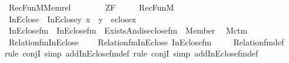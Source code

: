 %
\begin{isabellebody}%
%
%
\isadelimtheory
%
\endisadelimtheory
%
\isatagtheory
{}\isamarkupfalse%
\ RecFun{\isacharunderscore}{\kern0pt}M{\isacharunderscore}{\kern0pt}Memrel\isanewline
\ \ \ \isanewline
\ \ \ \ ZF\ \isanewline
\ \ \ \ RecFun{\isacharunderscore}{\kern0pt}M\isanewline
{}%
\endisatagtheory
{\isafoldtheory}%
%
\isadelimtheory
\ \isanewline
%
\endisadelimtheory
\isanewline
{}\isamarkupfalse%
\ InEclose\ \ {\isachardoublequoteopen}InEclose{\isacharparenleft}{\kern0pt}y{\isacharcomma}{\kern0pt}\ x{\isacharparenright}{\kern0pt}\ {\isasymequiv}\ y\ {\isasymin}\ eclose{\isacharparenleft}{\kern0pt}x{\isacharparenright}{\kern0pt}{\isachardoublequoteclose}\ \ \isanewline
{}\isamarkupfalse%
\ InEclose{\isacharunderscore}{\kern0pt}fm\ \ {\isachardoublequoteopen}InEclose{\isacharunderscore}{\kern0pt}fm\ {\isasymequiv}\ Exists{\isacharparenleft}{\kern0pt}And{\isacharparenleft}{\kern0pt}is{\isacharunderscore}{\kern0pt}eclose{\isacharunderscore}{\kern0pt}fm{\isacharparenleft}{\kern0pt}{}{\isacharcomma}{\kern0pt}\ {}{\isacharparenright}{\kern0pt}{\isacharcomma}{\kern0pt}\ Member{\isacharparenleft}{\kern0pt}{}{\isacharcomma}{\kern0pt}\ {}{\isacharparenright}{\kern0pt}{\isacharparenright}{\kern0pt}{\isacharparenright}{\kern0pt}{\isachardoublequoteclose}\isanewline
\isanewline
{}\isamarkupfalse%
\ M{\isacharunderscore}{\kern0pt}ctm\ \isanewline
{}\ \isanewline
\isanewline
{}\isamarkupfalse%
\ Relation{\isacharunderscore}{\kern0pt}fm{\isacharunderscore}{\kern0pt}InEclose\ {\isacharcolon}{\kern0pt}\ \isanewline
\ \ {\isachardoublequoteopen}Relation{\isacharunderscore}{\kern0pt}fm{\isacharparenleft}{\kern0pt}InEclose{\isacharcomma}{\kern0pt}\ InEclose{\isacharunderscore}{\kern0pt}fm{\isacharparenright}{\kern0pt}{\isachardoublequoteclose}\ \isanewline
%
\isadelimproof
\ \ %
\endisadelimproof
%
\isatagproof
{}\isamarkupfalse%
\ Relation{\isacharunderscore}{\kern0pt}fm{\isacharunderscore}{\kern0pt}def\ \isanewline
\ \ \isamarkupfalse%
{\isacharparenleft}{\kern0pt}rule\ conjI{\isacharcomma}{\kern0pt}\ simp\ add{\isacharcolon}{\kern0pt}InEclose{\isacharunderscore}{\kern0pt}fm{\isacharunderscore}{\kern0pt}def{\isacharcomma}{\kern0pt}\ rule\ conjI{\isacharcomma}{\kern0pt}\ simp\ add{\isacharcolon}{\kern0pt}InEclose{\isacharunderscore}{\kern0pt}fm{\isacharunderscore}{\kern0pt}def{\isacharparenright}{\kern0pt}\isanewline

\end{isabellebody}
